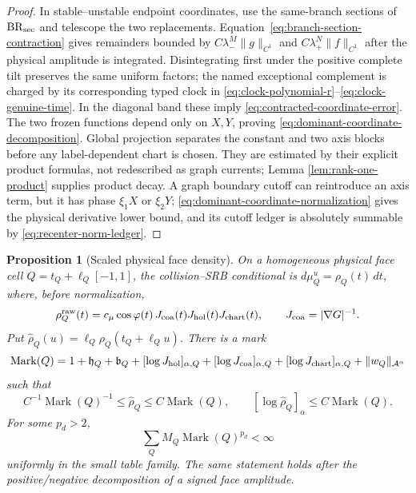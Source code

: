 \documentclass[11pt]{article}
\newtheorem{proposition}[theorem]{Proposition}
\begin{document}
\begin{proof}
In stable--unstable endpoint coordinates, use the same-branch sections of
$\mathrm{BR}_{\rm sec}$ and telescope the two replacements.
Equation~\eqref{eq:branch-section-contraction} gives remainders bounded by
$C\lambda_-^M\|g\|_{C^1}$ and $C\lambda_+^N\|f\|_{C^1}$ after the physical
amplitude is integrated.  Disintegrating first under the positive complete
tilt preserves the same uniform factors; the named exceptional complement is
charged by its corresponding typed clock in
\eqref{eq:clock-polynomial-r}--\eqref{eq:clock-genuine-time}.  In the diagonal band these imply
\eqref{eq:contracted-coordinate-error}.  The two frozen functions depend
only on $X,Y$, proving \eqref{eq:dominant-coordinate-decomposition}.  Global
projection separates the constant and two axis blocks before any
label-dependent chart is chosen.  They are estimated by their explicit
product formulas, not redescribed as graph currents; Lemma
\ref{lem:rank-one-product} supplies product decay.  A graph boundary
cutoff can reintroduce an axis term, but it has phase $\xi_1X$ or $\xi_2Y$;
\eqref{eq:dominant-coordinate-normalization} gives the physical derivative
lower bound, and its cutoff ledger is absolutely summable by
\eqref{eq:recenter-norm-ledger}.
\end{proof}

\begin{proposition}[Scaled physical face density]
\label{prop:scaled-face-density}
On a homogeneous physical face cell
\(Q=t_Q+\ell_Q[-1,1]\), the collision--SRB conditional is
\(d\mu_Q^u=\rho_Q(t)\,dt\), where, before normalization,
\begin{equation}
\label{eq:face-conditional-density}
 \rho_Q^{\rm raw}(t)=c_\mu\cos\varphi(t)\,J_{\rm coa}(t)
 J_{\rm hol}(t)J_{\rm chart}(t),
 \qquad J_{\rm coa}=|\nabla G|^{-1}.
\end{equation}
Put
\(\widehat\rho_Q(u)=\ell_Q\rho_Q(t_Q+\ell_Qu)\).  There is a mark
\begin{equation}
\label{eq:density-mark-definition}
 \operatorname{Mark}(Q)=
 1+\mathfrak h_Q+\mathfrak b_Q+
 [\log J_{\rm hol}]_{\alpha,Q}
 +[\log J_{\rm coa}]_{\alpha,Q}
 +[\log J_{\rm chart}]_{\alpha,Q}
 +\|w_Q\|_{\mathcal A^\alpha}
\end{equation}
such that
\begin{equation}
\label{eq:scaled-density-bound}
 C^{-1}\operatorname{Mark}(Q)^{-1}
 \le\widehat\rho_Q\le C\operatorname{Mark}(Q),\qquad
 [\log\widehat\rho_Q]_\alpha
 \le C\operatorname{Mark}(Q).
\end{equation}
For some \(p_d>2\),
\begin{equation}
\label{eq:density-mark-moment}
 \sum_Q M_Q\operatorname{Mark}(Q)^{p_d}<\infty
\end{equation}
uniformly in the small table family.  The same statement holds after the
positive/negative decomposition of a signed face amplitude.
\end{proposition}
\end{document}
